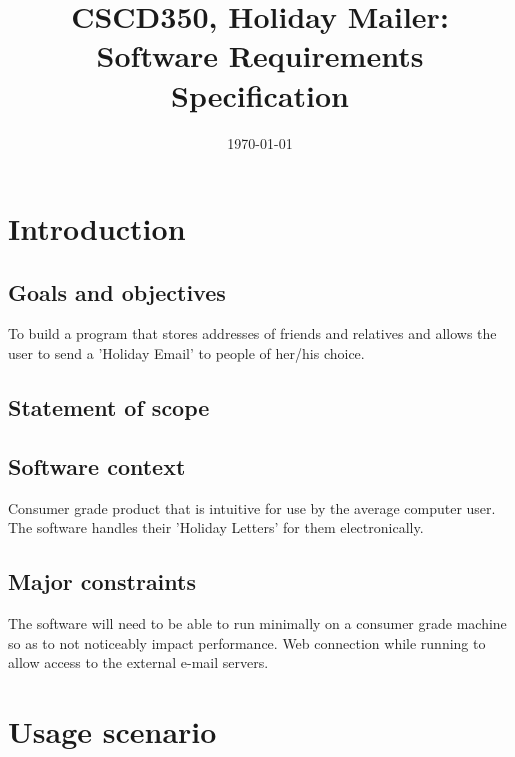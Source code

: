 \documentclass{article}
\title{CSCD350, Holiday Mailer: Software Requirements Specification}
\date{\today}
\begin{document}
\section{Introduction}

\subsection{Goals and objectives}
To build a program that stores addresses of friends and relatives and allows the user to send a 'Holiday Email' to people of her/his choice.

\subsection{Statement of scope}

\subsection{Software context}
Consumer grade product that is intuitive for use by the average computer user. The software handles their 'Holiday Letters' for them electronically.

\subsection{Major constraints}
The software will need to be able to run minimally on a consumer grade machine so as to not noticeably impact performance.
Web connection while running to allow access to the external e-mail servers.

\section{Usage scenario}
\end{document}

